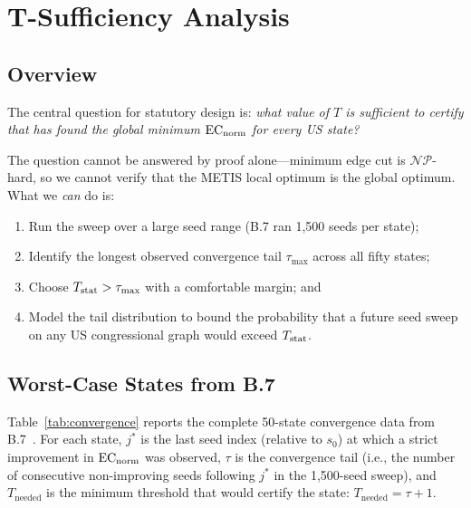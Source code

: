 \section{T-Sufficiency Analysis}
\label{sec:sufficiency}

\subsection{Overview}

The central question for statutory design is: \emph{what value of $T$ is
sufficient to certify that \cs{} has found the global minimum $\mathrm{EC}_{\mathrm{norm}}$ for
every US state?}

The question cannot be answered by proof alone---minimum edge cut is
$\mathcal{NP}$-hard, so we cannot verify that the METIS local optimum is the
global optimum.
What we \emph{can} do is:
\begin{enumerate}
\item Run the sweep over a large seed range (B.7 ran 1{,}500 seeds per state);
\item Identify the longest observed convergence tail $\tau_{\max}$ across all
      fifty states;
\item Choose $T_{\mathrm{stat}} > \tau_{\max}$ with a comfortable margin; and
\item Model the tail distribution to bound the probability that a future seed
      sweep on any US congressional graph would exceed $T_{\mathrm{stat}}$.
\end{enumerate}

\subsection{Worst-Case States from B.7}

Table~\ref{tab:convergence} reports the complete 50-state convergence
data from B.7~\citep{b7paper}.
For each state, $j^*$ is the last seed index (relative to $s_0$) at which
a strict improvement in $\mathrm{EC}_{\mathrm{norm}}$ was observed, $\tau$ is the convergence tail
(i.e., the number of consecutive non-improving seeds following $j^*$ in the
1{,}500-seed sweep), and $T_{\mathrm{needed}}$ is the minimum threshold that
would certify the state: $T_{\mathrm{needed}} = \tau + 1$.

